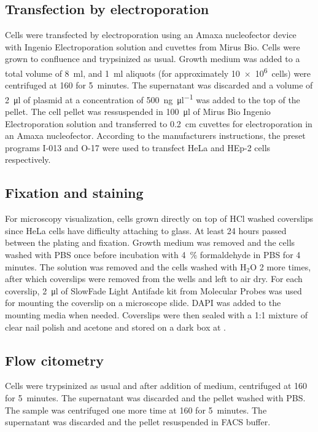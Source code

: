     \subsection{Transfection by electroporation}
      Cells were transfected by electroporation using an Amaxa nucleofector
      device with Ingenio Electroporation solution and cuvettes from Mirus Bio.
      Cells were grown to confluence and trypsinized as usual. Growth medium was
      added to a total volume of \SI{8}{\ml}, and \SI{1}{\ml} aliquots (for
      approximately \SI{10e6}{cells}) were centrifuged at \SI{160}{\gn} for 5~minutes.
      The supernatant was discarded and a volume of \SI{2}{\ul} of plasmid at
      a concentration of \SI{500}{\ng\per\ul} was added to the top of the pellet.
      The cell pellet was ressuspended in \SI{100}{\ul} of Mirus Bio Ingenio
      Electroporation solution and transferred to \SI{0.2}{\cm} cuvettes for
      electroporation in an Amaxa nucleofector. According to the manufacturers
      instructions, the preset programs I-013 and O-17 were used to transfect
      HeLa and HEp-2 cells respectively.


    \subsection{Fixation and staining}
      For microscopy visualization, cells grown directly on top of HCl washed coverslips since
      HeLa cells have difficulty attaching to glass. At least 24 hours passed
      between the plating and fixation. Growth medium was removed and the cells
      washed with PBS once before incubation with \SI{4}{\percent} formaldehyde in PBS
      for 4 minutes. The solution was removed and the cells washed with H$_2$O 2 more
      times, after which coverslips were removed from the wells and left to air dry.
      For each coverslip, \SI{2}{\ul} of SlowFade Light Antifade kit from Molecular Probes
      was used for mounting the coverslip on a microscope slide. DAPI was added
      to the mounting media when needed. Coverslips were then sealed with a 1:1
      mixture of clear nail polish and acetone and stored on a dark box at .

    \subsection{Flow citometry}

      Cells were trypsinized as usual and after addition of medium, centrifuged
      at \SI{160}{\gn} for 5~minutes. The supernatant was discarded and the
      pellet washed with PBS. The sample was centrifuged one more time at
      \SI{160}{\gn} for 5~minutes. The supernatant was discarded and the
      pellet resuspended in FACS buffer.

